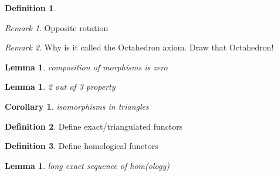 \documentclass[12pt]{article}
\newtheorem{corollary}{Corollary}[theorem]
\newtheorem{lemma}[theorem]{Lemma}
\theoremstyle{definition}
\newtheorem{definition}{Definition}[section]
\theoremstyle{remark}
\newtheorem*{remark}{Remark}
\begin{document}
\begin{definition}
\begin{enumerate}
                    \begin{center}
                    \end{center}
            \end{enumerate}
        \end{definition}

        \begin{remark}
            Opposite rotation
        \end{remark}

        \begin{remark}
            Why is it called the Octahedron axiom. Draw that Octahedron!
        \end{remark}

        \begin{lemma}
            composition of morphisms is zero
        \end{lemma}

        \begin{lemma}
            2 out of 3 property
        \end{lemma}

        \begin{corollary}
            isomorphisms in triangles
        \end{corollary}

        \begin{definition}
            Define exact/triangulated functors
        \end{definition}

        \begin{definition}
            Define homological functors
        \end{definition}

        \begin{lemma}
            long exact sequence of hom(ology)
        \end{lemma}
\end{document}
